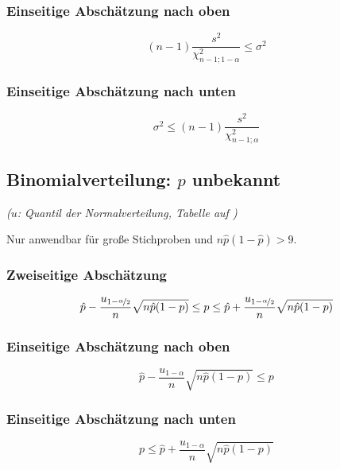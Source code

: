 \subsubsection*{Einseitige Abschätzung nach oben}
\[ (n-1)\frac{s^{2}}{\chi_{n-1;1-\alpha}^{2}}\leq\sigma^{2} \]

\subsubsection*{Einseitige Abschätzung nach unten}
\[ \sigma^{2}\leq(n-1)\frac{s^{2}}{\chi_{n-1;\alpha}^{2}} \]

\subsection*{Binomialverteilung: $p$ unbekannt}
\emph{($u$: Quantil der Normalverteilung, Tabelle auf )}

Nur anwendbar für große Stichproben und $n\hat{p}(1-\hat{p})>9$.

\subsubsection*{Zweiseitige Abschätzung}
\[ \hat{p}-\frac{u_{1-\nicefrac{\alpha}{2}}}{n}\sqrt{n\hat{p}(1-p)}\leq p\leq\hat{p}+\frac{u_{1-\nicefrac{\alpha}{2}}}{n}\sqrt{n\hat{p}(1-p)} \]

\subsubsection*{Einseitige Abschätzung nach oben}
\[ \hat{p}-\frac{u_{1-\alpha}}{n}\sqrt{n\hat{p}(1-p)}\leq p \]

\subsubsection*{Einseitige Abschätzung nach unten}
\[ p\leq\hat{p}+\frac{u_{1-\alpha}}{n}\sqrt{n\hat{p}(1-p)} \]

